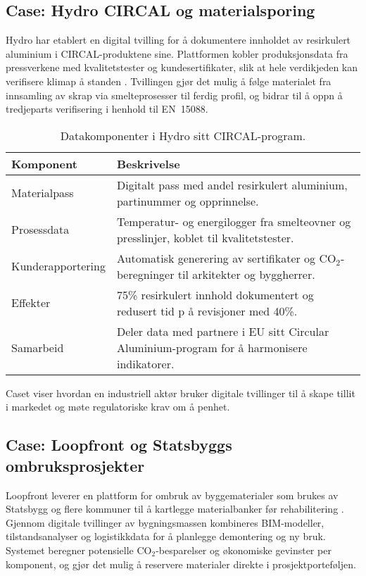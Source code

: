 \subsection{Case: Hydro CIRCAL og materialsporing}
Hydro har etablert en digital tvilling for  å dokumentere innholdet av resirkulert aluminium i CIRCAL-produktene sine. Plattformen kobler produksjonsdata fra pressverkene med kvalitetstester og kundesertifikater, slik at hele verdikjeden kan verifisere klimap å standen \citep{hydro2023traceability}. Tvillingen gjør det mulig  å følge materialet fra innsamling av skrap via smelteprosesser til ferdig profil, og bidrar til  å oppn å tredjeparts verifisering i henhold til EN~15088.

\begin{table}[ht]
    \centering
    \caption{Datakomponenter i Hydro sitt CIRCAL-program.}
    \label{tab:kap03-hydro}
    \begin{tabular}{p{}p{}}
        \toprule
        \textbf{Komponent} & \textbf{Beskrivelse} \\
        \midrule
        Materialpass & Digitalt pass med andel resirkulert aluminium, partinummer og opprinnelse. \\
        Prosessdata & Temperatur- og energilogger fra smelteovner og presslinjer, koblet til kvalitetstester. \\
        Kunderapportering & Automatisk generering av sertifikater og CO$_2$-beregninger til arkitekter og byggherrer. \\
        Effekter & 75\% resirkulert innhold dokumentert og redusert tid p å revisjoner med 40\%. \\
        Samarbeid & Deler data med partnere i EU sitt Circular Aluminium-program for  å harmonisere indikatorer. \\
        \bottomrule
    \end{tabular}
\end{table}

Caset viser hvordan en industriell aktør bruker digitale tvillinger til  å skape tillit i markedet og møte regulatoriske krav om  å penhet.

\subsection{Case: Loopfront og Statsbyggs ombruksprosjekter}
Loopfront leverer en plattform for ombruk av byggematerialer som brukes av Statsbygg og flere kommuner til  å kartlegge materialbanker før rehabilitering \citep{statsbygg2023loopfront}. Gjennom digitale tvillinger av bygningsmassen kombineres BIM-modeller, tilstandsanalyser og logistikkdata for  å planlegge demontering og ny bruk. Systemet beregner potensielle CO$_2$-besparelser og økonomiske gevinster per komponent, og gjør det mulig  å reservere materialer direkte i prosjektporteføljen.

